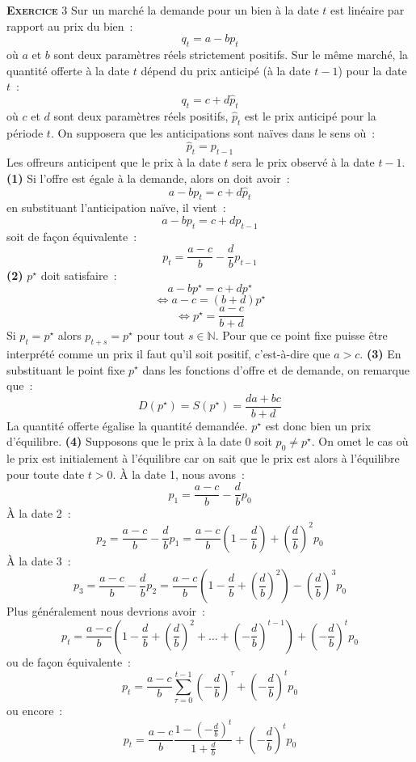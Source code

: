 \documentclass[10pt,a4paper,notitlepage]{article}
\newcommand{\exercice}[1]{\textsc{\textbf{Exercice}} #1}
\begin{document}
\exercice{3} Sur un marché la demande pour un bien à la date $t$ est linéaire par
rapport au prix du bien :
\[
q_t = a - b p_t
\]
où $a$ et $b$ sont deux paramètres réels strictement positifs. Sur le même marché,
la quantité offerte à la date $t$ dépend du prix anticipé (à la date
$t-1$) pour la date $t$ :
\[
q_t = c + d \hat p_t
\]
où $c$ et $d$ sont deux paramètres réels positifs, $\hat p_t$ est le
prix anticipé pour la période $t$. On supposera que les anticipations
sont naïves dans le sens où :
\[
\hat p_t = p_{t-1}
\]
Les offreurs anticipent que le prix à la date $t$ sera le prix observé
à la date $t-1$. \textbf{(1)} Si l'offre est égale à la demande, alors
on doit avoir :
\[
a - b p_t = c + d \hat p_t
\]
en substituant l'anticipation naïve, il vient :
\[
a - b p_t = c + d p_{t-1}
\]
soit de façon équivalente :
\[
p_t = \frac{a-c}{b} - \frac{d}{b}p_{t-1}
\]
\textbf{(2)} $p^{\star}$ doit satisfaire :
\[
a - b p^{\star} = c + d p^{\star}
\]
\[
\Leftrightarrow a - c = (b+d) p^{\star}
\]
\[
\Leftrightarrow  p^{\star} = \frac{a-c}{b+d}
\]
Si $p_t = p^{\star}$ alors $p_{t+s} = p^{\star}$ pour tout $s\in
\mathbb N$. Pour que ce point fixe puisse être interprété comme un
prix il faut qu'il soit positif, c'est-à-dire que $a>c$. \textbf{(3)}
En substituant le point fixe $p^{\star}$ dans les fonctions d'offre et
de demande, on remarque que :
\[
D(p^{\star}) = S(p^{\star}) = \frac{da+bc}{b+d}
\]
La quantité offerte égalise la quantité demandée. $p^{\star}$ est
donc bien un prix d'équilibre. \textbf{(4)}
Supposons que  le prix à la date 0 soit $p_0\neq p^{\star}$. On omet
le cas où le prix est initialement à l'équilibre car on sait que le
prix est alors à l'équilibre pour toute date $t>0$. À la date 1, nous
avons :
\[
p_1 = \frac{a-c}{b} - \frac{d}{b}p_0
\]
À la date 2 :
\[
p_2 = \frac{a-c}{b} - \frac{d}{b}p_1 =
\frac{a-c}{b}\left(1-\frac{d}{b}\right) + \left(\frac{d}{b}\right)^2p_0
\]
À la date 3 :
\[
p_3 = \frac{a-c}{b} - \frac{d}{b}p_2 =
\frac{a-c}{b}\left(1-\frac{d}{b}+\left(\frac{d}{b}\right)^2\right) - \left(\frac{d}{b}\right)^3p_0
\]
Plus généralement nous devrions avoir :
\[
p_t =
\frac{a-c}{b}\left(1-\frac{d}{b}+\left(\frac{d}{b}\right)^2+\dots+\left(-\frac{d}{b}\right)^{t-1}\right)
+ \left(-\frac{d}{b}\right)^{t}p_0
\]
ou de façon équivalente :
\[
p_t = \frac{a-c}{b}\sum_{\tau=0}^{t-1}
\left(-\frac{d}{b}\right)^{\tau} + \left(-\frac{d}{b}\right)^{t}p_0
\]
ou encore :
\[
p_t = \frac{a-c}{b}\frac{1-\left(-\frac{d}{b}\right)^{t}}{1+\frac{d}{b}} + \left(-\frac{d}{b}\right)^{t}p_0
\]
\end{document}
